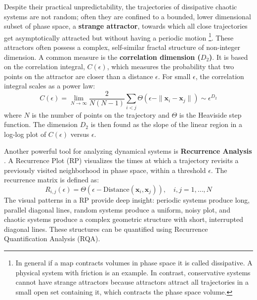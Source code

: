 \documentclass[a4paper,12pt]{article}
\begin{document}
Despite their practical unpredictability, the trajectories of dissipative chaotic systems are not random; often they are confined to a bounded, lower dimensional subset of phase space, a \textbf{strange attractor}, towards which all close trajectories get asymptotically attracted but without having a periodic motion \footnote{In general if a map contracts volumes in phase space it is called dissipative. A physical system with friction is an example. In contrast, conservative systems cannot have strange attractors because attractors attract all trajectories in a small open set containing it, which contracts the phase space volume.}.
These attractors often possess a complex, self-similar fractal structure of non-integer dimension. A common measure is the \textbf{correlation dimension ($D_2$)}. It is based on the correlation integral, $C(\epsilon)$, which measures the probability that two points on the attractor are closer than a distance $\epsilon$. For small $\epsilon$, the correlation integral scales as a power law:
\begin{equation}
    C(\epsilon) = \lim_{N \to \infty} \frac{2}{N(N-1)} \sum_{i<j} \Theta(\epsilon - \|\mathbf{x}_i - \mathbf{x}_j\|) \sim \epsilon^{D_2}
\end{equation}
where $N$ is the number of points on the trajectory and $\Theta$ is the Heaviside step function. The dimension $D_2$ is then found as the slope of the linear region in a log-log plot of $C(\epsilon)$ versus $\epsilon$.

Another powerful tool for analyzing dynamical systems is \textbf{Recurrence Analysis} \cite{MARWAN2007237}. A Recurrence Plot (RP) visualizes the times at which a trajectory revisits a previously visited neighborhood in phase space, within a threshold $\epsilon$. The recurrence matrix is defined as:
\begin{equation}
    R_{i,j}(\epsilon) = \Theta(\epsilon - \text{Distance}(\mathbf{x}_i, \mathbf{x}_j)), \quad i,j = 1, \dots, N 
\end{equation}
The visual patterns in a RP provide deep insight: periodic systems produce long, parallel diagonal lines, random systems produce a uniform, noisy plot, and chaotic systems produce a complex geometric structure with short, interrupted diagonal lines. These structures can be quantified using Recurrence Quantification Analysis (RQA).
\end{document}
